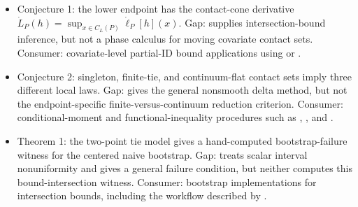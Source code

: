 \documentclass[11pt]{article}
\theoremstyle{definition}
\theoremstyle{plain}
\theoremstyle{remark}
\begin{document}
\begin{itemize}[leftmargin=*]
  \item Conjecture 1: the lower endpoint has the contact-cone derivative \(\dot L_P(h)=\sup_{x\in C_L(P)}\dot\ell_P[h](x)\). Gap: \citet{ChernozhukovLeeRosen2013} supplies intersection-bound inference, but not a phase calculus for moving covariate contact sets. Consumer: covariate-level partial-ID bound applications using \citet{Manski1990} or \citet{ManskiPepper2000}.
  \item Conjecture 2: singleton, finite-tie, and continuum-flat contact sets imply three different local laws. Gap: \citet{FangSantos2019} gives the general nonsmooth delta method, but not the endpoint-specific finite-versus-continuum reduction criterion. Consumer: conditional-moment and functional-inequality procedures such as \citet{AndrewsShi2013}, \citet{Armstrong2014}, and \citet{LeeSongWhang2018}.
  \item Theorem 1: the two-point tie model gives a hand-computed bootstrap-failure witness for the centered naive bootstrap. Gap: \citet{ImbensManski2004} treats scalar interval nonuniformity and \citet{FangSantos2019} gives a general failure condition, but neither computes this bound-intersection witness. Consumer: bootstrap implementations for intersection bounds, including the workflow described by \citet{ChernozhukovKimLeeRosen2015}.
\end{itemize}
\end{document}
